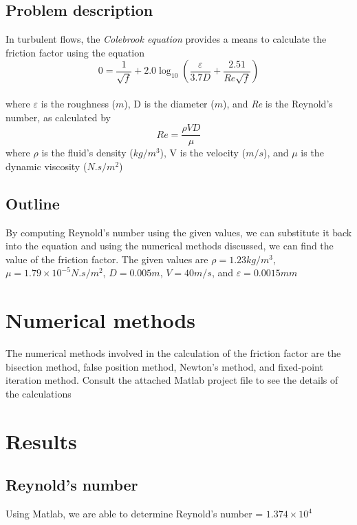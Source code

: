 \documentclass[openany]{book}
\begin{document}
	\subsection{Problem description}
	In turbulent flows, the \textit{Colebrook equation} provides a means to calculate the friction factor using the equation\\
    \[ 0 =  \frac{1}{\sqrt{f}} + 2.0 \log_{10} \left(\frac{\varepsilon}{3.7D} + \frac{2.51}{\textit{Re}\sqrt{f}}\right) \] \\
    where $\varepsilon$ is the roughness (${m}$), D is the diameter (${m}$), and \textit{Re} is the Reynold's number, as calculated by
    \[\textit{Re} = \frac{\rho V D}{\mu}\]
    where $\rho$ is the fluid's density (${kg/m^{3}}$), V is the velocity (${m/s}$), and ${\mu}$ is the dynamic viscosity (${N.s/m^2}$)
    
	\subsection{Outline}
	By computing Reynold's number using the given values, we can substitute it back into the equation and using the numerical methods discussed, we can find the value of the friction factor. The given values are ${\rho = 1.23 kg/m^3}$, ${\mu = 1.79 \times 10^{-5} N.s/m^2}$, ${D = 0.005 m}$, ${V = 40 m/s}$, and ${\varepsilon = 0.0015 mm}$
	
	\section{Numerical methods}
	The numerical methods involved in the calculation of the friction factor are the bisection method, false position method, Newton's method, and fixed-point iteration method. Consult the attached Matlab project file to see the details of the calculations
	
	\section{Results}
	\subsection{Reynold's number}
    Using Matlab, we are able to determine Reynold's number = ${1.374 \times 10^4}$
\end{document}
